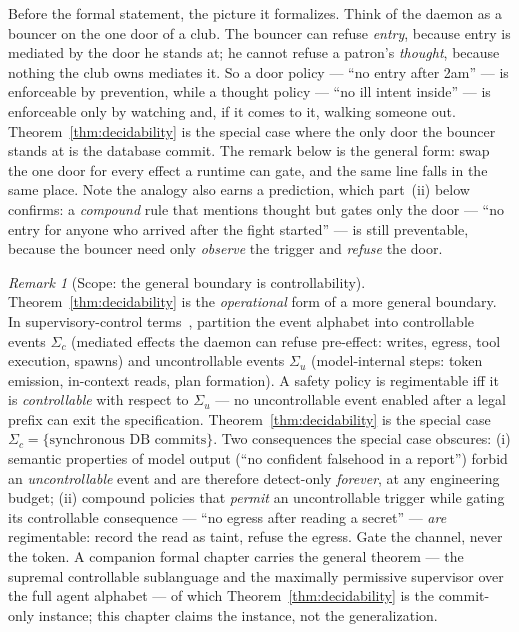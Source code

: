\documentclass[11pt,a4paper]{article}
\theoremstyle{definition}
\theoremstyle{remark}
\newtheorem*{remark}{Remark}
\begin{document}
Before the formal statement, the picture it formalizes. Think of the daemon as a
bouncer on the one door of a club. The bouncer can refuse \emph{entry}, because
entry is mediated by the door he stands at; he cannot refuse a patron's
\emph{thought}, because nothing the club owns mediates it. So a door policy --- ``no
entry after 2am'' --- is enforceable by prevention, while a thought policy --- ``no
ill intent inside'' --- is enforceable only by watching and, if it comes to it,
walking someone out. Theorem~\ref{thm:decidability} is the special case where the
only door the bouncer stands at is the database commit. The remark below is the
general form: swap the one door for every effect a runtime can gate, and the same
line falls in the same place. Note the analogy also earns a prediction, which
part~(ii) below confirms: a \emph{compound} rule that mentions thought but gates
only the door --- ``no entry for anyone who arrived after the fight started'' ---
is still preventable, because the bouncer need only \emph{observe} the trigger and
\emph{refuse} the door.

\begin{remark}[Scope: the general boundary is controllability]\label{rem:controllability-scope}
Theorem~\ref{thm:decidability} is the \emph{operational} form of a more general boundary. In supervisory-control terms~\cite{rw87,rw89}, partition the event alphabet into controllable events $\Sigma_c$ (mediated effects the daemon can refuse pre-effect: writes, egress, tool execution, spawns) and uncontrollable events $\Sigma_u$ (model-internal steps: token emission, in-context reads, plan formation). A safety policy is regimentable iff it is \emph{controllable} with respect to $\Sigma_u$ --- no uncontrollable event enabled after a legal prefix can exit the specification. Theorem~\ref{thm:decidability} is the special case $\Sigma_c = \{\text{synchronous DB commits}\}$. Two consequences the special case obscures: (i) semantic properties of model output (``no confident falsehood in a report'') forbid an \emph{uncontrollable} event and are therefore detect-only \emph{forever}, at any engineering budget; (ii) compound policies that \emph{permit} an uncontrollable trigger while gating its controllable consequence --- ``no egress after reading a secret'' --- \emph{are} regimentable: record the read as taint, refuse the egress. Gate the channel, never the token. A companion formal chapter carries the general theorem --- the supremal controllable sublanguage and the maximally permissive supervisor over the full agent alphabet --- of which Theorem~\ref{thm:decidability} is the commit-only instance; this chapter claims the instance, not the generalization.
\end{remark}
\end{document}
